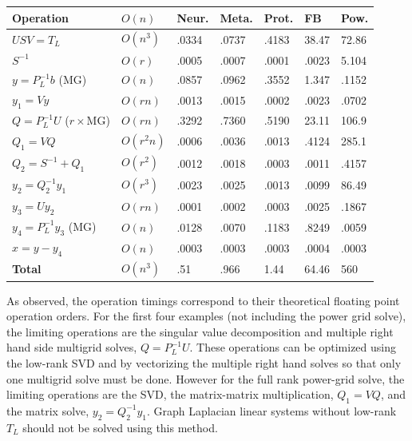 \documentclass{article}
\begin{document}
\begin{center}
\renewcommand{\arraystretch}{1.5}
    \begin{tabular}{ | l | l | l | l | l | l | l |}
    \hline
    \textbf{Operation} & \textbf{$O(n)$} & \textbf{Neur.} & \textbf{Meta.} & \textbf{Prot.} & \textbf{FB} & \textbf{Pow.} \\ \hline
    $USV = T_L$ & $O(n^3)$ & .0334 & .0737 & .4183 & 38.47 & 72.86  \\ \hline
    $S^{-1}$ & $O(r)$ & .0005 & .0007 & .0001 & .0023 & 5.104 \\ \hline
    $y = P_L^{-1}b$ (MG) & $O(n)$ & .0857 & .0962 & .3552 & 1.347 & .1152  \\  \hline
    $y_1 = Vy$ & $O(rn)$ & .0013 & .0015 & .0002 & .0023 & .0702 \\ \hline
    $Q = P_L^{-1}U$ ($r\times$MG) & $O(rn)$ & .3292 & .7360 & .5190 & 23.11 & 106.9  \\ \hline
    $Q_1 = VQ$ & $O(r^2 n)$ & .0006 & .0036 & .0013 & .4124 & 285.1 \\ \hline
    $Q_2 = S^{-1} + Q_1$ & $O(r^2)$ & .0012 & .0018 & .0003 & .0011 & .4157 \\ \hline
    $y_2 = Q_2^{-1}y_1$ & $O(r^3)$ & .0023 & .0025 & .0013 & .0099 & 86.49 \\ \hline
    $y_3 = Uy_2$ & $O(rn)$ & .0001 & .0002 & .0003 & .0025 & .1867 \\ \hline
    $y_4 = P_L^{-1}y_3$ (MG) & $O(n)$ &.0128 & .0070 & .1183 & .8249 & .0059 \\ \hline
    $x = y - y_4$ & $O(n)$ &.0003 & .0003 & .0003 & .0004 & .0003 \\ \hline
    \textbf{Total} & $O(n^3)$ & .51 & .966 & 1.44 & 64.46 & 560 \\
    \hline
    \end{tabular}
\end{center}
As observed, the operation timings correspond to their theoretical floating point operation orders. For the first four examples (not including the power grid solve), the limiting operations are the singular value decomposition and multiple right hand side multigrid solves, $Q = P_L^{-1}U$. These operations can be optimized using the low-rank SVD and by vectorizing the multiple right hand solves so that only one multigrid solve must be done. However for the full rank power-grid solve, the limiting operations are the SVD, the matrix-matrix multiplication, $Q_1 = VQ$, and the matrix solve, $y_2 = Q_2^{-1}y_1$. Graph Laplacian linear systems without low-rank $T_L$ should not be solved using this method.

%
%
\end{document}
